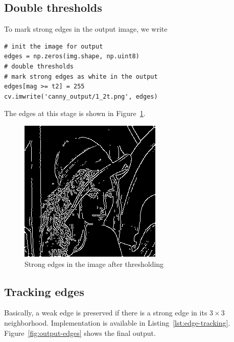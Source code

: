 \documentclass{ee208report}
\begin{document}
\begin{multicols*}{2}
\subsection{Double thresholds}

To mark strong edges in the output image, we write

\begin{verbatim}
# init the image for output
edges = np.zeros(img.shape, np.uint8)
# double thresholds
# mark strong edges as white in the output
edges[mag >= t2] = 255
cv.imwrite('canny_output/1_2t.png', edges)
\end{verbatim}

The edges at this stage is shown in Figure~\ref{fig:strong-edges}.

\begin{figure}[H]
    \centering
    \includegraphics[width=0.8\linewidth]{images/1_2t.png}
    \caption{Strong edges in the image after thresholding}
    \label{fig:strong-edges}
\end{figure}

\subsection{Tracking edges}

Basically, a weak edge is preserved if there is a strong edge in its
$3 \times 3$ neighborhood. Implementation is available in
Listing~\ref{lst:edge-tracking}. Figure~\ref{fig:output-edges} shows the final
output.


\end{multicols*}
\end{document}
